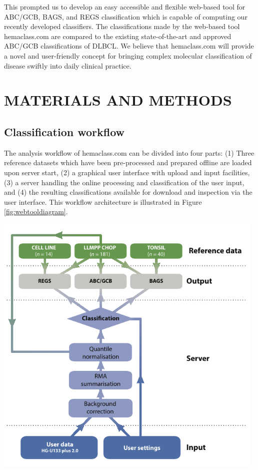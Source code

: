 \documentclass[10pt]{bmc_article}
\newenvironment{bmcformat}{\fussy\setboolean{publ}{true}}{\fussy}
\newenvironment{Figure}
  {\par\bigskip\noindent\minipage{\columnwidth}\centering}
  {\endminipage\par\bigskip}
\begin{document}
\begin{bmcformat}
This prompted us to develop an easy accessible and flexible web-based tool for ABC/GCB, BAGS, and REGS classification which is capable of computing our recently developed classifiers. The classifications made by the web-based tool hemaclass.com are compared to the existing state-of-the-art and approved ABC/GCB classifications of DLBCL. We believe that hemaclass.com will provide a novel and user-friendly concept for bringing complex molecular classification of disease swiftly into daily clinical practice.


\section*{MATERIALS AND METHODS}

\subsection*{Classification workflow}
The analysis workflow of hemaclass.com can be divided into four parts: (1) Three reference datasets which have been pre-processed and prepared offline are loaded upon server start, (2) a graphical user interface with upload and input facilities, (3) a server handling the online processing and classification of the user input, and (4) the resulting classifications available for download and inspection via the user interface. This workflow architecture is illustrated in Figure \ref{fig:webtooldiagram}.

\begin{Figure}
\begin{center}
\includegraphics[width=0.975\textwidth]{Flowchart6.pdf}
\end{center}
\label{fig:webtooldiagram}
\end{Figure}


\end{bmcformat}
\end{document}
